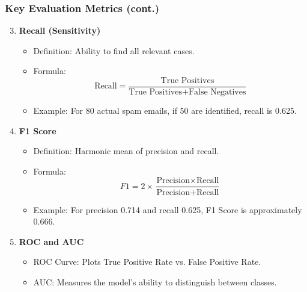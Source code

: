 \documentclass[aspectratio=169]{beamer}
\begin{document}
\begin{frame}
    \frametitle{Key Evaluation Metrics (cont.)}
    \begin{enumerate}
        \setcounter{enumi}{2}
        \item \textbf{Recall (Sensitivity)}
            \begin{itemize}
                \item Definition: Ability to find all relevant cases.
                \item Formula: 
                \[
                \text{Recall} = \frac{\text{True Positives}}{\text{True Positives} + \text{False Negatives}}
                \]
                \item Example: For 80 actual spam emails, if 50 are identified, recall is 0.625.
            \end{itemize}
        \item \textbf{F1 Score}
            \begin{itemize}
                \item Definition: Harmonic mean of precision and recall.
                \item Formula: 
                \[
                F1 = 2 \times \frac{\text{Precision} \times \text{Recall}}{\text{Precision} + \text{Recall}}
                \]
                \item Example: For precision 0.714 and recall 0.625, F1 Score is approximately 0.666.
            \end{itemize}
        \item \textbf{ROC and AUC}
            \begin{itemize}
                \item ROC Curve: Plots True Positive Rate vs. False Positive Rate.
                \item AUC: Measures the model's ability to distinguish between classes.
            \end{itemize}
    \end{enumerate}
\end{frame}
\end{document}
